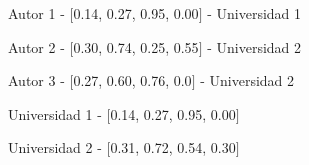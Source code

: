 \begin{description}
 \item[Autor - Topic Profile - Universidad]
 \item Autor 1 - $[$0.14, 0.27, 0.95, 0.00$]$ - Universidad 1
 \item Autor 2 - $[$0.30, 0.74, 0.25, 0.55$]$ - Universidad 2
 \item Autor 3 - $[$0.27, 0.60, 0.76, 0.0$]$ - Universidad 2
\end{description}

\begin{description}
 \item[Universidad - Topic Profile]
 \item Universidad 1 - $[$0.14, 0.27, 0.95, 0.00$]$
 \item Universidad 2 - $[$0.31, 0.72, 0.54, 0.30$]$
\end{description}

